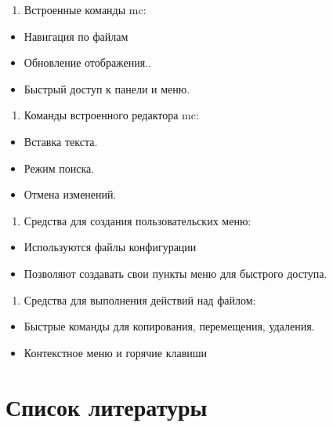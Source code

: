 \documentclass[
  english,
  russian,
  12pt,
  a4paper,
  DIV=11,
  numbers=noendperiod]{scrreprt}
\newcounter{none} %
\providecommand{\tightlist}{%
  \setlength{\itemsep}{0pt}\setlength{\parskip}{0pt}}
\begin{document}
\begin{enumerate}
\def\labelenumi{\arabic{enumi}.}
\setcounter{enumi}{6}
\tightlist
\item
  Встроенные команды mc:
\end{enumerate}

\begin{itemize}
\tightlist
\item
  Навигация по файлам
\item
  Обновление отображения..
\item
  Быстрый доступ к панели и меню.
\end{itemize}

\begin{enumerate}
\def\labelenumi{\arabic{enumi}.}
\setcounter{enumi}{7}
\tightlist
\item
  Команды встроенного редактора mc:
\end{enumerate}

\begin{itemize}
\tightlist
\item
  Вставка текста.
\item
  Режим поиска.
\item
  Отмена изменений.
\end{itemize}

\begin{enumerate}
\def\labelenumi{\arabic{enumi}.}
\setcounter{enumi}{8}
\tightlist
\item
  Средства для создания пользовательских меню:
\end{enumerate}

\begin{itemize}
\tightlist
\item
  Используются файлы конфигурации
\item
  Позволяют создавать свои пункты меню для быстрого доступа.
\end{itemize}

\begin{enumerate}
\def\labelenumi{\arabic{enumi}.}
\setcounter{enumi}{9}
\tightlist
\item
  Средства для выполнения действий над файлом:
\end{enumerate}

\begin{itemize}
\tightlist
\item
  Быстрые команды для копирования, перемещения, удаления.
\item
  Контекстное меню и горячие клавиши
\end{itemize}

\chapter*{Список
литературы}\label{ux441ux43fux438ux441ux43eux43a-ux43bux438ux442ux435ux440ux430ux442ux443ux440ux44b}

\printbibliography[heading=none]
\end{document}

